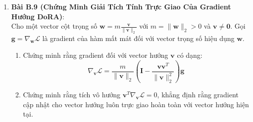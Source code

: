 \begin{enumerate}
  \item \textbf{Bài B.9 (Chứng Minh Giải Tích Tính Trực Giao Của Gradient Hướng DoRA)}: \\
  Cho một vector cột trọng số $\mathbf{w} = m \frac{\mathbf{v}}{\|\mathbf{v}\|_2}$ với $m = \|\mathbf{w}\|_2 > 0$ và $\mathbf{v} \neq \mathbf{0}$.
  Gọi $\mathbf{g} = \nabla_{\mathbf{w}} \mathcal{L}$ là gradient của hàm mất mát đối với vector trọng số hiệu dụng $\mathbf{w}$.
  \begin{enumerate}
    \item Chứng minh rằng gradient đối với vector hướng $\mathbf{v}$ có dạng:
    \begin{equation*}
    \nabla_{\mathbf{v}} \mathcal{L} = \frac{m}{\|\mathbf{v}\|_2} \left( \mathbf{I} - \frac{\mathbf{v}\mathbf{v}^T}{\|\mathbf{v}\|_2^2} \right) \mathbf{g}
    \end{equation*}
    \item Chứng minh rằng tích vô hướng $\mathbf{v}^T \nabla_{\mathbf{v}} \mathcal{L} = 0$, khẳng định rằng gradient cập nhật cho vector hướng luôn trực giao hoàn toàn với vector hướng hiện tại.
  \end{enumerate}
\end{enumerate}

